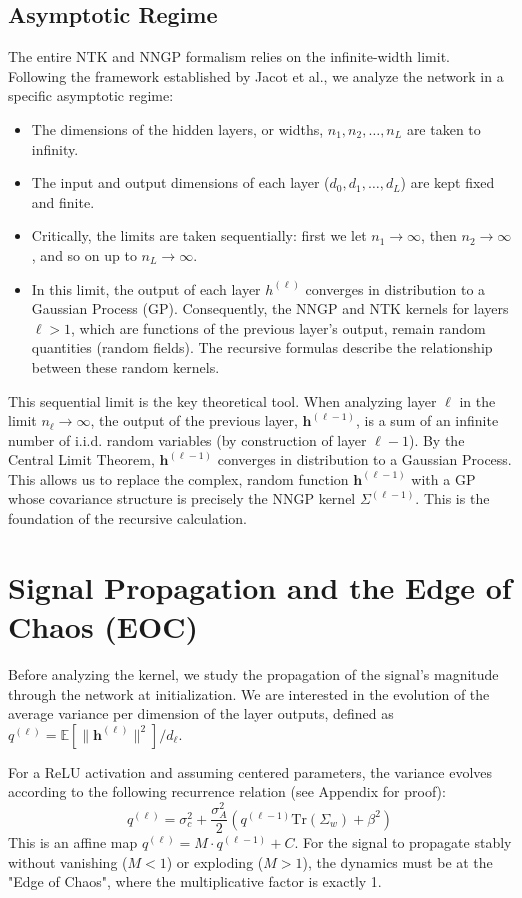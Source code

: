 \documentclass[a4paper]{article}
\begin{document}
\subsection{Asymptotic Regime}
The entire NTK and NNGP formalism relies on the infinite-width limit. Following the framework established by Jacot et al., we analyze the network in a specific asymptotic regime:
\begin{itemize}
    \item The dimensions of the hidden layers, or widths, $n_1, n_2, \dots, n_L$ are taken to infinity.
    \item The input and output dimensions of each layer ($d_0, d_1, \dots, d_L$) are kept fixed and finite.
    \item Critically, the limits are taken sequentially: first we let $n_1 \to \infty$, then $n_2 \to \infty$, and so on up to $n_L \to \infty$.
    \item In this limit, the output of each layer $h^{(\ell)}$ converges in distribution to a Gaussian Process (GP). Consequently, the NNGP and NTK kernels for layers $\ell > 1$, which are functions of the previous layer's output, remain random quantities (random fields). The recursive formulas describe the relationship between these random kernels.
\end{itemize}
This sequential limit is the key theoretical tool. When analyzing layer $\ell$ in the limit $n_\ell \to \infty$, the output of the previous layer, $\bm{h}^{(\ell-1)}$, is a sum of an infinite number of i.i.d. random variables (by construction of layer $\ell-1$). By the Central Limit Theorem, $\bm{h}^{(\ell-1)}$ converges in distribution to a Gaussian Process. This allows us to replace the complex, random function $\bm{h}^{(\ell-1)}$ with a GP whose covariance structure is precisely the NNGP kernel $\Sigma^{(\ell-1)}$. This is the foundation of the recursive calculation.

\section{Signal Propagation and the Edge of Chaos (EOC)}
Before analyzing the kernel, we study the propagation of the signal's magnitude through the network at initialization. We are interested in the evolution of the average variance per dimension of the layer outputs, defined as $q^{(\ell)} = \mathbb{E}[\|\bm{h}^{(\ell)}\|^2]/d_\ell$.

For a ReLU activation and assuming centered parameters, the variance evolves according to the following recurrence relation (see Appendix for proof):
\begin{equation}
    q^{(\ell)} = \sigma_c^2 + \frac{\sigma_A^2}{2} \left( q^{(\ell-1)}\text{Tr}(\Sigma_w) + \beta^2 \right)
\end{equation}
This is an affine map $q^{(\ell)} = M \cdot q^{(\ell-1)} + C$. For the signal to propagate stably without vanishing ($M<1$) or exploding ($M>1$), the dynamics must be at the "Edge of Chaos", where the multiplicative factor is exactly 1.
\end{document}
